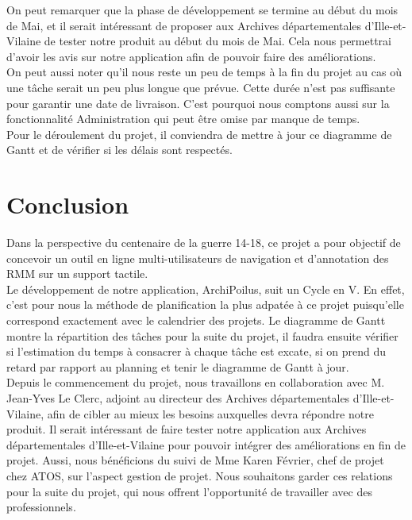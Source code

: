 \documentclass[a4paper]{article}
\begin{document}
	On peut remarquer que la phase de développement se termine au début du mois de Mai, et il serait intéressant de proposer aux Archives départementales d’Ille-et-Vilaine de tester notre produit au début du mois de Mai. Cela nous permettrai d'avoir les avis sur notre application afin de pouvoir faire des améliorations.\\

	On peut aussi noter qu'il nous reste un peu de temps à la fin du projet au cas où une tâche serait un peu plus longue que prévue. Cette durée n'est pas suffisante pour garantir une date de livraison. C'est pourquoi nous comptons aussi sur la fonctionnalité Administration qui peut être omise par manque de temps.\\
	
	Pour le déroulement du projet, il conviendra de mettre à jour ce diagramme de Gantt et de vérifier si les délais sont respectés.

\newpage
{}
{}
\section*{Conclusion}

	Dans la perspective du centenaire de la guerre 14-18, ce projet a pour objectif de concevoir un outil en ligne multi-utilisateurs de navigation et d’annotation des RMM sur un support tactile.\\
	
	Le développement de notre application, ArchiPoilus, suit un Cycle en V. En effet, c'est pour nous la méthode de planification la plus adpatée à ce projet puisqu'elle correspond exactement avec le calendrier des projets. Le diagramme de Gantt montre la répartition des tâches pour la suite du projet, il faudra ensuite vérifier si l'estimation du temps à consacrer à chaque tâche est excate, si on prend du retard par rapport au planning et tenir le diagramme de Gantt à jour.\\
	
	Depuis le commencement du projet, nous travaillons en collaboration avec M. Jean-Yves Le Clerc, adjoint au directeur des Archives départementales d’Ille-et-Vilaine, afin de cibler au mieux les besoins auxquelles devra répondre notre produit. Il serait intéressant de faire tester notre application aux Archives départementales d’Ille-et-Vilaine pour pouvoir intégrer des améliorations en fin de projet. Aussi, nous bénéficions du suivi de Mme Karen Février, chef de projet chez ATOS, sur l’aspect gestion de projet. Nous souhaitons garder ces relations pour la suite du projet, qui nous offrent l’opportunité de travailler avec des professionnels.\\
	
\end{document}
